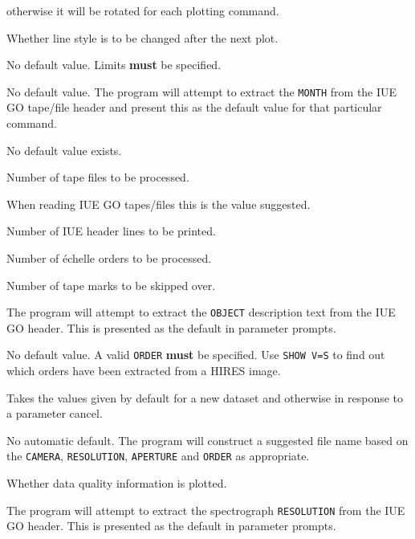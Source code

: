 \begin {description}
   otherwise it will be rotated for each plotting command.
\item [\htmlref{LINEROT}{LINEROT} = FALSE] \lmbox
   Whether line style is to be changed after the next plot.
\item [\htmlref{ML}{ML}] \lmbox
   No default value.  Limits {\bf must} be specified.
\item [\htmlref{MONTH}{MONTH}] \lmbox
   No default value.  The program will attempt to extract the \verb+MONTH+ from
   the IUE GO tape/file header and present this as the default value for that
   particular command.
\item [\htmlref{MSAMP}{MSAMP}] \lmbox
   No default value exists.
\item [\htmlref{NFILE}{NFILE} = 1] \lmbox
   Number of tape files to be processed.
\item [\htmlref{NGEOM}{NGEOM} = 5] \lmbox
   When reading IUE GO tapes/files this is the value suggested.
\item [\htmlref{NLINE}{NLINE} = 10] \lmbox
   Number of IUE header lines to be printed.
\item [\htmlref{NORDER}{NORDER} = 0] \lmbox
   Number of \'{e}chelle orders to be processed.
\item [\htmlref{NSKIP}{NSKIP} = 1] \lmbox
   Number of tape marks to be skipped over.
\item [\htmlref{OBJECT}{OBJECT}] \lmbox
   The program will attempt to extract the \verb+OBJECT+ description text from
   the IUE GO header.  This is presented as the default in parameter prompts.
\item [\htmlref{ORDER}{ORDER}] \lmbox
   No default value. A valid \verb+ORDER+ {\bf must} be specified.
   Use \verb+SHOW V=S+ to find out which orders have been extracted from a
   HIRES image.
\item [{\htmlref{ORDERS}{ORDERS} (=[125,66])}] \lmbox
   Takes the values given by default for a new dataset and otherwise in
   response to a parameter cancel.
\item [\htmlref{OUTFILE}{OUTFILE}] \lmbox
   No automatic default.  The program will construct a suggested file name
   based on the \verb+CAMERA+, \verb+RESOLUTION+, \verb+APERTURE+ and
   \verb+ORDER+ as appropriate.
\item [\htmlref{QUAL}{QUAL} = TRUE] \lmbox
   Whether data quality information is plotted.
\item [\htmlref{RESOLUTION}{RESOLUTION}] \lmbox
   The program will attempt to extract the spectrograph \verb+RESOLUTION+ from
   the IUE GO header.  This is presented as the default in parameter prompts.

\end{description}

